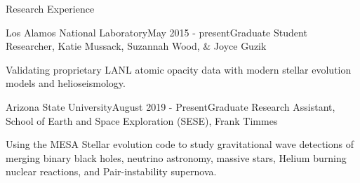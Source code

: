 \documentclass{resume} %
\begin{document}
\begin{rSection}{Research Experience}

\begin{rSubsection}{Los Alamos National Laboratory}{May 2015 - present}{Graduate Student Researcher, Katie Mussack, Suzannah Wood, \& Joyce Guzik}{}
\item Validating proprietary LANL atomic opacity data with modern stellar evolution models and helioseismology.
\end{rSubsection}




\begin{rSubsection}{Arizona State University}{August 2019 - Present}{Graduate Research Assistant, School of Earth and Space Exploration (SESE), Frank Timmes}{}
\item Using the MESA Stellar evolution code to study gravitational wave detections of merging binary black holes, neutrino astronomy, massive stars, Helium burning nuclear reactions, and Pair-instability supernova.
\end{rSubsection}





\end{rSection}



\end{document}

